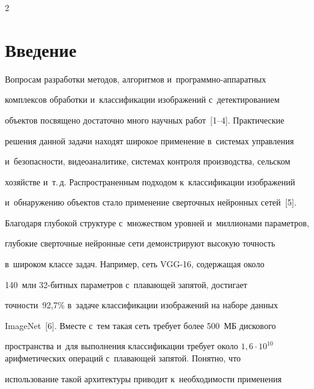 \begin{multicols}{2}





\label{st\stat}





\section{Введение}





\vspace*{-2pt}





  Вопросам разработки методов, алгоритмов и~про\-грам\-мно-ап\-па\-рат\-ных 


комплексов обработки и~классификации изображений с~детектированием 


объектов по\-свя\-ще\-но до\-ста\-точ\-но много научных работ~[1--4]. Практические 


решения данной задачи находят широкое применение в~сис\-те\-мах управ\-ле\-ния 


и~безопас\-ности, видеоаналитике, сис\-те\-мах конт\-ро\-ля производства, сельском 


хозяйстве и~т.\,д. Распространенным подходом к~классификации изображений 


и~обнаружению объектов стало применение сверточных нейронных сетей~[5]. 


Благодаря глубокой структуре с~множеством уровней и~миллионами па\-ра\-мет\-ров, 


глубокие сверточные нейронные сети демонстрируют высокую точ\-ность 


в~широком классе задач. Например, сеть VGG-16, содержащая около 


140~млн 32-бит\-ных па\-ра\-мет\-ров с~пла\-ва\-ющей запятой, достигает  


точ\-ности~92,7\% в~задаче классификации изображений на наборе данных 


ImageNet~[6]. Вмес\-те с~тем такая сеть требует более 500~МБ дискового 


пространства и~для выполнения классификации требует около $1{,}6\cdot 


10^{10}$ ариф\-ме\-ти\-че\-ских операций с~пла\-ва\-ющей запятой. Понятно, что 


использование такой архитектуры приводит к~не\-об\-хо\-ди\-мости применения 



\end{multicols}
